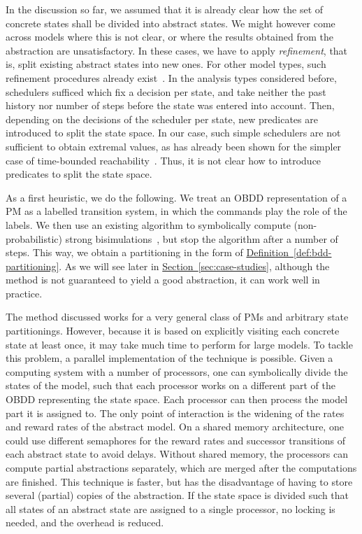 \documentclass[10pt,twocolumn]{article}
\newcommand{\refsec}[1]{\texorpdfstring{\hyperref[sec:#1]{Section~\ref*{sec:#1}}}{Section~\ref*{sec:#1}}}
\newcommand{\refdef}[1]{\texorpdfstring{\hyperref[def:#1]{Definition~\ref*{def:#1}}}{Definition \ref*{def:#1}}}
\begin{document}
In the discussion so far, we assumed that it is already clear how the
set of concrete states shall be divided into abstract states. We
might however come across models where this is not clear, or where the
results obtained from the abstraction are unsatisfactory. In these
cases, we have to apply \emph{refinement}, that is, split existing
abstract states into new ones. For other model types, such refinement
procedures already exist~\cite{KattenbeltKNP10,HermannsWZ08}. In the
analysis types considered before, schedulers sufficed which fix a
decision per state, and take neither the past history nor number of
steps before the state was entered into account. Then, depending on
the decisions of the scheduler per state, new predicates are
introduced to split the state space. In our case, such simple
schedulers are not sufficient to obtain extremal values, as has
already been shown for the simpler case of time-bounded
reachability~\cite{BaierHKH05}. Thus, it is not clear how to
introduce predicates to split the state space.

As a first heuristic, we do the following. We treat an OBDD
representation of a PM as a labelled transition system, in which the
commands play the role of the labels. We then use an existing
algorithm to symbolically compute (non-probabilistic) strong
bisimulations~\cite{wimmer-et-al-atva-2006}, but stop the algorithm
after a number of steps. This way, we obtain a partitioning in the
form of \refdef{bdd-partitioning}. As we will see later in
\refsec{case-studies}, although the method is not guaranteed to yield
a good abstraction, it can work well in practice.

The method discussed works for a very general class of PMs and
arbitrary state partitionings. However, because it is based on
explicitly visiting each concrete state at least once, it may take
much time to perform for large models.  To tackle this problem, a
parallel implementation of the technique is possible.  Given a
computing system with a number of processors, one can symbolically
divide the states of the model, such that each processor works on a
different part of the OBDD representing the state space.  Each
processor can then process the model part it is assigned to.  The only
point of interaction is the widening of the rates and reward rates of
the abstract model.  On a shared memory architecture, one could use
different semaphores for the reward rates and successor transitions of
each abstract state to avoid delays.  Without shared memory, the
processors can compute partial abstractions separately, which are
merged after the computations are finished.  This technique is faster,
but has the disadvantage of having to store several (partial) copies
of the abstraction.  If the state space is divided such that all
states of an abstract state are assigned to a single processor, no
locking is needed, and the overhead is reduced.
\end{document}
